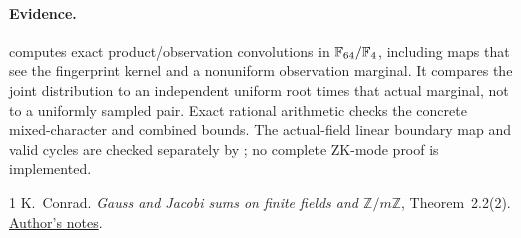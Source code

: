 \documentclass[11pt]{article}
\begin{document}
\paragraph{Evidence.}  computes exact product/observation convolutions in $\mathbb{F}_{64}/\mathbb{F}_4$, including maps that see the fingerprint kernel and a nonuniform observation marginal. It compares the joint distribution to an independent uniform root times that actual marginal, not to a uniformly sampled pair. Exact rational arithmetic checks the concrete mixed-character and combined bounds. The actual-field linear boundary map and valid cycles are checked separately by ; no complete ZK-mode proof is implemented.

\begin{thebibliography}{1}
 K.~Conrad. \emph{Gauss and Jacobi sums on finite fields and $\mathbb Z/m\mathbb Z$}, Theorem~2.2(2). \href{https://kconrad.math.uconn.edu/blurbs/gradnumthy/Gauss-Jacobi-sums.pdf}{Author's notes}.
\end{thebibliography}
\end{document}
